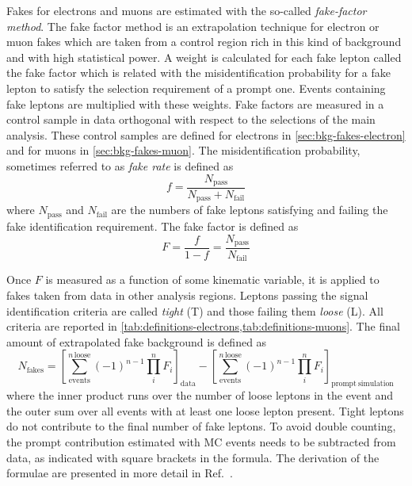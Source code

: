 Fakes for electrons and muons are estimated with the so-called
\textit{fake-factor method}.
The fake factor method is an extrapolation technique for electron or muon fakes
which are taken from a control region rich in this kind of background and with
high statistical power. A weight is calculated for each fake lepton called
the fake factor which is related with the misidentification probability
for a fake lepton to satisfy the selection requirement of a prompt one. Events
containing fake leptons are multiplied with these weights.
Fake factors are measured in a control sample in data orthogonal with respect
to the selections of the main analysis.
These control samples are defined for electrons in \cref{sec:bkg-fakes-electron}
and for muons in \cref{sec:bkg-fakes-muon}.
The misidentification probability, sometimes referred to as \textit{fake rate}
is defined as
\begin{equation}
  f = \dfrac{N_\mathrm{pass}}{N_\mathrm{pass}+N_\mathrm{fail}}
  \label{eq:fake-rate}
\end{equation}
where \( N_\mathrm{pass} \) and \( N_\mathrm{fail} \) are the numbers of fake
leptons satisfying and failing the fake identification requirement. The fake factor
is defined as
\begin{equation}
  F = \frac{f}{1-f} =  \dfrac{N_\mathrm{pass}}{N_\mathrm{fail}}
  \label{eq:fake-factor}
\end{equation}

Once \(F\) is measured as a function of some kinematic variable, it is applied
to fakes taken from data in other analysis regions.
Leptons passing the signal identification
criteria are called \textit{tight} (T) and those failing them \textit{loose} (L).
All criteria are reported in \cref{tab:definitions-electrons,tab:definitions-muons}.
The final amount of extrapolated fake background is defined as
\begin{equation}
  N_\mathrm{fakes} =
  {\left[
  \sum\limits_\mathrm{events}^{n\, \mathrm{loose}}
  {(-1)}^{n-1} \prod\limits_{i}^{n} F_i
  \right]}_\mathrm{data}
  -
  {\left[
  \sum\limits_\mathrm{events}^{n\, \mathrm{loose}}
  {(-1)}^{n-1} \prod\limits_{i}^{n} F_i
  \right]}_\mathrm{prompt~simulation}
\end{equation}
where the inner product runs over the number of loose leptons in the event and
the outer sum over all events with at least one loose lepton present.
Tight leptons do not contribute to the final number of fake leptons.
To avoid double counting, the prompt contribution estimated with MC events needs
to be subtracted from data, as indicated with square brackets in the formula.
The derivation of the formulae are presented in more detail
in Ref.~\cite{EGAM-2019-01}.


